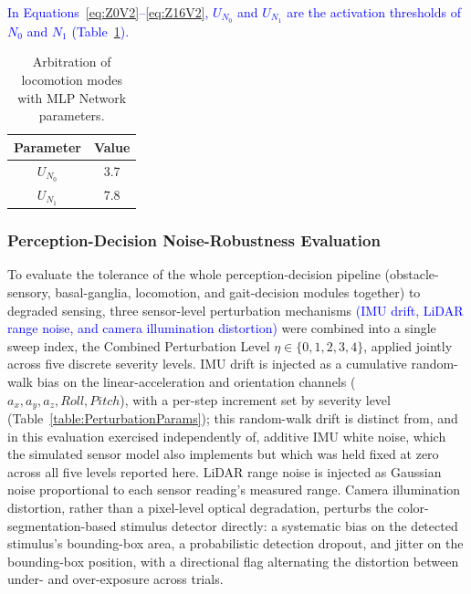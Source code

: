 \documentclass[preprint,12pt]{elsarticle}
\newcommand{\revblue}[1]{\textcolor{blue}{#1}}
\begin{document}
\revblue{In Equations~\eqref{eq:Z0V2}--\eqref{eq:Z16V2}, $U_{N_0}$ and $U_{N_1}$ are the activation thresholds of $N_0$ and $N_1$ (Table~\ref{table:Locom_MLP}).}

\begin{table}%
\centering
\caption{Arbitration of locomotion modes with MLP Network parameters.}
\begin{tabular}{|c|c|}
\hline
\textbf{Parameter} & \textbf{Value} \\ \hline

$U_{N_{0}}$ & 3.7 \\ \hline
$U_{N_{1}}$ & 7.8 \\ \hline

\end{tabular}
\label{table:Locom_MLP}
\end{table}

\subsubsection{Perception-Decision Noise-Robustness Evaluation}
\label{ssec:NoiseRobustnessEval}

To evaluate the tolerance of the whole perception-decision pipeline (obstacle-sensory, basal-ganglia, locomotion, and gait-decision modules together) to degraded sensing, three sensor-level perturbation mechanisms \revblue{(IMU drift, LiDAR range noise, and camera illumination distortion)} were combined into a single sweep index, the Combined Perturbation Level $\eta \in \{0,1,2,3,4\}$, applied jointly across five discrete severity levels. IMU drift is injected as a cumulative random-walk bias on the linear-acceleration and orientation channels ($a_x,a_y,a_z,Roll,Pitch$), with a per-step increment set by severity level (Table~\ref{table:PerturbationParams}); this random-walk drift is distinct from, and in this evaluation exercised independently of, additive IMU white noise, which the simulated sensor model also implements but which was held fixed at zero across all five levels reported here. LiDAR range noise is injected as Gaussian noise proportional to each sensor reading's measured range. Camera illumination distortion, rather than a pixel-level optical degradation, perturbs the color-segmentation-based stimulus detector directly: a systematic bias on the detected stimulus's bounding-box area, a probabilistic detection dropout, and jitter on the bounding-box position, with a directional flag alternating the distortion between under- and over-exposure across trials.
\end{document}
